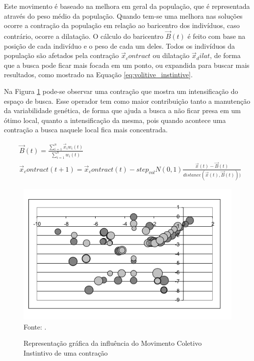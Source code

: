 Este movimento é baseado na melhora em geral da população, que é representada através do peso médio da população. Quando tem-se uma melhora nas soluções ocorre a contração da população em relação ao baricentro dos indivíduos, caso contrário, ocorre a dilatação. O cálculo do baricentro $\vec{B}(t)$ é feito com base na posição de cada indivíduo e o peso de cada um deles. Todos os indivíduos da população são afetados pela contração $\vec{x}_contract$ ou dilatação $\vec{x}_dilat$, de forma que a busca pode ficar mais focada em um ponto, ou expandida para buscar mais resultados, como mostrado na Equação \ref{eq:volitive_instintive}. 

Na Figura \ref{fig:volitute_moviment} pode-se observar uma contração que mostra um intensificação do espaço de busca. Esse operador tem como maior contribuição tanto a manutenção da variabilidade genética, de forma que ajuda a busca a não ficar presa em um ótimo local, quanto a intensificação da mesma, pois quando acontece uma contração a busca naquele local fica mais concentrada.

\begin{equation}
\label{eq:volitive_instintive}
\begin{split}
& \vec{B}(t) = \frac{\sum_{i=1}^{n} \vec{x}_i  w_i(t)}{\sum_{i=1}^{n} w_i(t)} \\
& \vec{x}_contract(t+1) = \vec{x}_contract(t) - step_{vol}N(0,1) \frac{\vec{x}(t)-\vec{B}(t)} {\textit{distance}(\vec{x}(t),\vec{B}(t)))}
\end{split}
\end{equation}

\begin{figure}[!htb]
	\caption{Representação gráfica da influência do Movimento Coletivo Instintivo de uma contração}
	\centering
	\includegraphics[scale=0.5]{images/movimento_volatil.png}
	\label{fig:volitute_moviment}{\\Fonte: .}
\end{figure}

